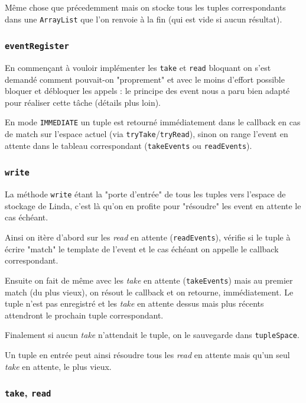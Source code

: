 \documentclass[headings=standardclasses,parskip=half]{scrartcl}
\begin{document}
Même chose que précedemment mais on stocke tous les tuples correspondants
dans une \texttt{ArrayList} que l'on renvoie à la fin (qui est vide
si aucun résultat).

\subsubsection*{\texttt{eventRegister}}

En commençant à vouloir implémenter les \texttt{take} et \texttt{read}
bloquant on s'est demandé comment pouvait-on "proprement" et avec le
moins d'effort possible bloquer et débloquer les appels : le principe
des event nous a paru bien adapté pour réaliser cette tâche
(détails plus loin).

En mode \texttt{IMMEDIATE} un tuple est retourné immédiatement dans
le callback en cas de match sur l'espace actuel
(via \texttt{tryTake}/\texttt{tryRead}),
sinon on range l'event en attente dans le tableau correspondant
(\texttt{takeEvents} ou \texttt{readEvents}).

\subsubsection*{\texttt{write}}

La méthode \texttt{write} étant la "porte d'entrée" de tous les tuples
vers l'espace de stockage de Linda, c'est là qu'on en profite pour
"résoudre" les event en attente le cas échéant.

Ainsi on itère d'abord sur les \emph{read} en attente (\texttt{readEvents}),
vérifie si le tuple à écrire "match" le template de l'event et le cas
échéant on appelle le callback correspondant.

Ensuite on fait de même avec les \emph{take} en attente (\texttt{takeEvents})
mais au premier match (du plus vieux), on résout le callback et on retourne,
immédiatement. Le tuple n'est pas enregistré et les \emph{take} en attente
dessus mais plus récents attendront le prochain tuple correspondant.

Finalement si aucun \emph{take} n'attendait le tuple, on le sauvegarde dans
\texttt{tupleSpace}.

Un tuple en entrée peut ainsi résoudre tous les \emph{read} en attente mais
qu'un seul \emph{take} en attente, le plus vieux.

\subsubsection*{\texttt{take}, \texttt{read}}
\end{document}
